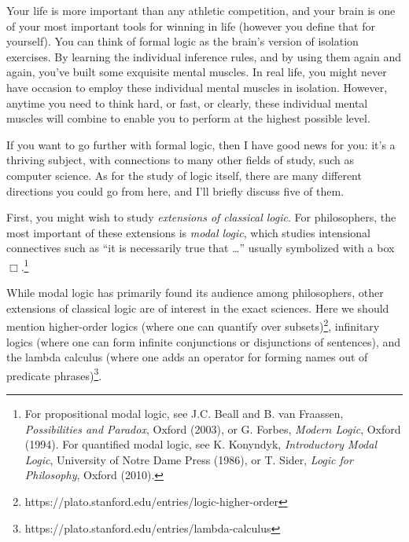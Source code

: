 Your life is more important than any athletic competition, and your
brain is one of your most important tools for winning in life (however
you define that for yourself).  You can think of formal logic as the
brain's version of isolation exercises.  By learning the individual
inference rules, and by using them again and again, you've built some
exquisite mental muscles.  In real life, you might never have occasion
to employ these individual mental muscles in isolation.  However,
anytime you need to think hard, or fast, or clearly, these individual
mental muscles will combine to enable you to perform at the highest
possible level.

If you want to go further with formal logic, then I have good news for
you: it's a thriving subject, with connections to many other fields of
study, such as computer science.  As for the study of logic itself,
there are many different directions you could go from here, and I'll
briefly discuss five of them.

First, you might wish to study \emph{extensions of classical logic}.
For philosophers, the most important of these extensions is
\emph{modal logic}, which studies intensional connectives such as ``it
is necessarily true that \dots '' usually symbolized with a box
$\Box$.\footnote{For propositional modal logic, see J.C. Beall and
  B. van Fraassen, {\it Possibilities and Paradox}, Oxford (2003), or
  G. Forbes, {\it Modern Logic}, Oxford (1994).  For quantified modal
  logic, see K. Konyndyk, {\it Introductory Modal Logic}, University
  of Notre Dame Press (1986), or T. Sider, {\it Logic for Philosophy},
  Oxford (2010).}

While modal logic has primarily found its audience among philosophers,
other extensions of classical logic are of interest in the exact
sciences.  Here we should mention higher-order logics (where one can
quantify over
subsets)\footnote{https://plato.stanford.edu/entries/logic-higher-order},
infinitary logics (where one can form infinite conjunctions or
disjunctions of sentences), and the lambda calculus (where one adds an
operator for forming names out of predicate
phrases)\footnote{https://plato.stanford.edu/entries/lambda-calculus}.

